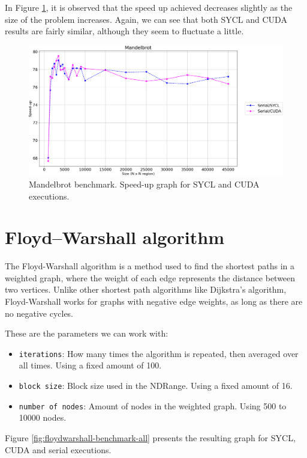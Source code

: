 In Figure \ref{fig:mandelbrot-speed-up}, it is observed that the speed up achieved decreases slightly as the size of the problem increases.
Again, we can see that both SYCL and CUDA results are fairly similar, although they seem to fluctuate a little.

\begin{figure}[H]
	\centering
	\includegraphics[width=\linewidth]{images/mandelbrot-speed-up-sycl-cuda.png}
	\caption{Mandelbrot benchmark. Speed-up graph for SYCL and CUDA executions.}
	\label{fig:mandelbrot-speed-up}
\end{figure}

\section{Floyd–Warshall algorithm}

The Floyd-Warshall algorithm is a method used to find the shortest paths in a weighted graph, where the weight of each edge represents the distance between two vertices.
Unlike other shortest path algorithms like Dijkstra's algorithm, Floyd-Warshall works for graphs with negative edge weights, as long as there are no negative cycles.

These are the parameters we can work with:
\begin{itemize}
    \item \texttt{iterations}: How many times the algorithm is repeated, then averaged over all times. Using a fixed amount of 100.
    \item \texttt{block size}: Block size used in the NDRange. Using a fixed amount of 16.
    \item \texttt{number of nodes}: Amount of nodes in the weighted graph. Using 500 to 10000 nodes.
\end{itemize}

Figure \ref{fig:floydwarshall-benchmark-all} presents the resulting graph for SYCL, CUDA and serial executions.

